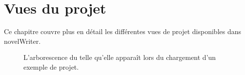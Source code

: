 \documentclass[a4paper,11pt,french]{sphinxmanual}
\begin{document}
\sphinxstepscope


\chapter{Vues du projet}
\label{\detokenize{usage_project:project-views}}\label{\detokenize{usage_project:a-ui-project}}\label{\detokenize{usage_project::doc}}
\sphinxAtStartPar
Ce chapitre couvre plus en détail les différentes vues de projet disponibles dans novelWriter.

\begin{figure}[htbp]
\centering
\capstart

\noindent{}
\caption{L’arborescence du  telle qu’elle apparaît lors du chargement d’un exemple de projet.}\label{\detokenize{usage_project:id1}}\end{figure}
\end{document}
